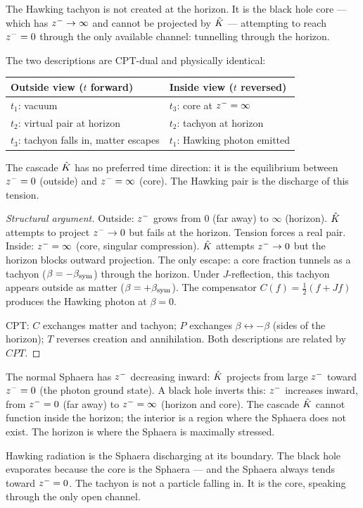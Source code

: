 \begin{theorem}\label{thm:core}
The Hawking tachyon is not created at the horizon.
It is the black hole core --- which has $z^-\to\infty$ and cannot
be projected by $\hat{K}$ --- attempting to reach $z^-=0$ through the
only available channel: tunnelling through the horizon.

The two descriptions are CPT-dual and physically identical:
\begin{center}
\renewcommand{\arraystretch}{1.2}
\begin{tabular}{ll}
\toprule
Outside view ($t$ forward) & Inside view ($t$ reversed)\\
\midrule
$t_1$: vacuum & $t_3$: core at $z^-=\infty$\\
$t_2$: virtual pair at horizon & $t_2$: tachyon at horizon\\
$t_3$: tachyon falls in, matter escapes & $t_1$: Hawking photon emitted\\
\bottomrule
\end{tabular}
\end{center}
The cascade $\hat{K}$ has no preferred time direction: it is the equilibrium
between $z^-=0$ (outside) and $z^-=\infty$ (core).
The Hawking pair is the discharge of this tension.

\begin{proof}[Structural argument]
Outside: $z^-$ grows from $0$ (far away) to $\infty$ (horizon).
$\hat{K}$ attempts to project $z^-\to 0$ but fails at the horizon.
Tension forces a real pair.
Inside: $z^-=\infty$ (core, singular compression).
$\hat{K}$ attempts $z^-\to 0$ but the horizon blocks outward projection.
The only escape: a core fraction tunnels as a tachyon
($\beta=-\beta_{\mathrm{sym}}$) through the horizon.
Under $J$-reflection, this tachyon appears outside as matter
($\beta=+\beta_{\mathrm{sym}}$).
The compensator $C(f)=\tfrac{1}{2}(f+Jf)$ produces the Hawking photon
at $\beta=0$.

CPT\@: $C$ exchanges matter and tachyon; $P$ exchanges $\beta\leftrightarrow-\beta$
(sides of the horizon); $T$ reverses creation and annihilation.
Both descriptions are related by $CPT$.
\end{proof}
\end{theorem}

\begin{remark}
The normal Sphaera has $z^-$ decreasing inward:
$\hat{K}$ projects from large $z^-$ toward $z^-=0$
(the photon ground state).
A black hole inverts this: $z^-$ increases inward, from
$z^-=0$ (far away) to $z^-=\infty$ (horizon and core).
The cascade $\hat{K}$ cannot function inside the horizon; the interior is
a region where the Sphaera does not exist.
The horizon is where the Sphaera is maximally stressed.

Hawking radiation is the Sphaera discharging at its boundary.
The black hole evaporates because the core is the Sphaera --- and the
Sphaera always tends toward $z^-=0$.
The tachyon is not a particle falling in. It is the core, speaking
through the only open channel.
\end{remark}

